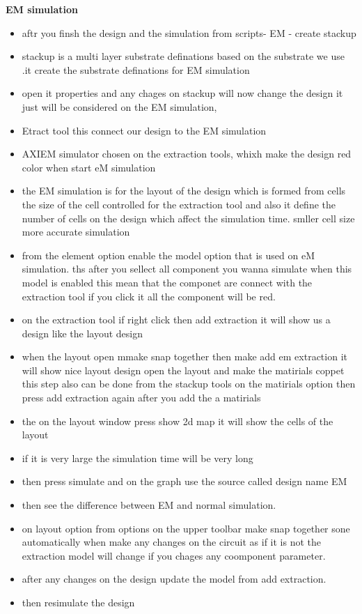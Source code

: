 \documentclass{article}
\begin{document}
\begin{itemize}
\textbf{EM simulation}
\begin{itemize}
    \item aftr you finsh the design and the simulation from scripts- EM - create stackup 
    \item stackup is a multi layer substrate definations based on the substrate we use .it create the substrate definations for EM simulation  
    \item open it properties and any chages on stackup will now  change the design it just will be considered on the EM simulation, 
    \item Etract tool this connect our design to the EM simulation 
    \item AXIEM simulator chosen on the extraction tools, whixh make the design red color when start eM simulation 
    \item the EM simulation is for the layout of the design which is formed from cells the size of the cell controlled for the extraction tool and also it define the number of cells on the design which affect the simulation time. smller cell size more accurate simulation 
    \item  from the element option enable the model option that is used on eM simulation. ths after you sellect  all component you wanna simulate when this model is enabled this mean that the componet are connect with the extraction tool if you click it all the component will be red.
    \item on the extraction tool if right click then add extraction it will show us a design like the layout design 
    \item when the layout open mmake snap together then make add  em extraction it will show nice layout design open the layout and make the matirials coppet this step also can be done from the stackup tools on the matirials option then press add extraction again after you add the a matirials 
    \item the on the layout window press show 2d map it will show the cells of the layout 
    \item if it is very large the simulation time will be very long 
    \item then press simulate and on the graph use the source called design name EM 
    \item then see the difference between EM and normal simulation.
    \item on layout option from options on the upper  toolbar  make snap together sone automatically when make any changes on the circuit as if it is not the extraction model will change if you chages any coomponent parameter.
    \item after any changes on the design update the model from add extraction.
    \item then resimulate the design 
    

\end{itemize}
\end{itemize}
\end{document}
